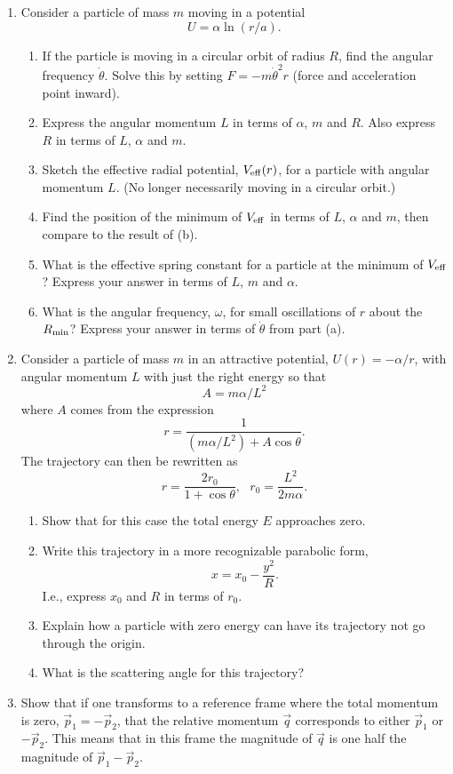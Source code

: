 \begin{enumerate}
\item Consider a particle of mass $m$ moving in a potential
\[
U=\alpha\ln(r/a).
\]
\begin{enumerate}
\item If the particle is moving in a circular orbit of radius $R$, find the angular frequency $\dot{\theta}$. Solve this by setting $F=-m\dot{\theta}^2r$ (force and acceleration point inward).
\item Express the angular momentum $L$ in terms of $\alpha$, $m$ and $R$. Also express $R$ in terms of $L$, $\alpha$ and $m$.
\item Sketch the effective radial potential, $V_{\rm eff}(r)$, for a particle with angular momentum $L$. (No longer necessarily moving in a circular orbit.)
\item Find the position of the minimum of $V_{\rm eff}$ in terms of $L$, $\alpha$ and $m$, then compare to the result of (b).
\item What is the effective spring constant for a particle at the minimum of $V_{\rm eff}$? Express your answer in terms of $L$, $m$ and $\alpha$. 
\item What is the angular frequency, $\omega$, for small oscillations of $r$ about the $R_{\rm min}$?  Express your answer in terms of $\dot{\theta}$ from part (a).
\end{enumerate}

\item Consider a particle of mass $m$ in an attractive potential, $U(r)=-\alpha/r$, with angular momentum $L$ with just the right energy so that
\[
A=m\alpha/L^2
\]
where $A$ comes from the expression
\[
r=\frac{1}{(m\alpha/L^2)+A\cos\theta}.
\]
The trajectory can then be rewritten as
\[
r=\frac{2r_0}{1+\cos\theta},~~~r_0=\frac{L^2}{2m\alpha}.
\]
\begin{enumerate}
\item Show that for this case the total energy $E$ approaches zero.
\item Write this trajectory in a more recognizable parabolic form,
\[
x=x_0-\frac{y^2}{R}.
\]
I.e., express $x_0$ and $R$ in terms of $r_0$.
\item Explain how a particle with zero energy can have its trajectory not go through the origin.
\item What is the scattering angle for this trajectory?
\end{enumerate}

\item Show that if one transforms to a reference frame where the total momentum is zero, $\vec{p}_1=-\vec{p}_2$, that the relative momentum $\vec{q}$ corresponds to either $\vec{p}_1$ or $-\vec{p}_2$. This means that in this frame the magnitude of $\vec{q}$ is one half the magnitude of $\vec{p}_1-\vec{p}_2$.


\end{enumerate}
